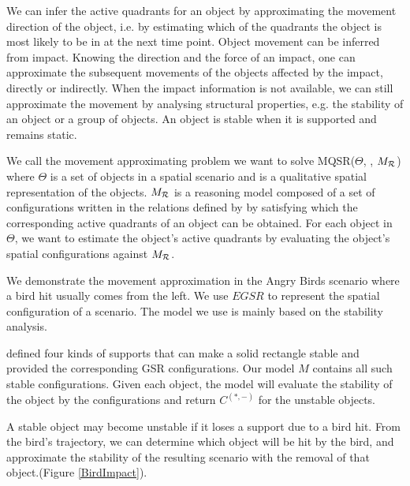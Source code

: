 \documentclass[letterpaper]{article}
\begin{document}
We can infer the active quadrants for an object by approximating the movement direction of the object, i.e. by estimating which of the quadrants the object is most likely to be in at the next time point. Object movement can be inferred from impact. Knowing the direction and the force of an impact, one can approximate the subsequent movements of the objects affected by the impact, directly or indirectly. When the impact information is not available, we can still approximate the movement by analysing structural properties, e.g. the stability of an object or a group of objects. An object is stable when it is supported and remains static. %

We call the movement approximating problem we want to solve MQSR($\Theta$, , $M_{\cal{R}}$) where $\Theta$ is a set of objects in a spatial scenario and  is a qualitative spatial representation of the objects. $M_{\cal{R}}$ is a reasoning model composed of a set of configurations written in the relations defined by  by satisfying which the corresponding active quadrants of an object can be obtained. For each object in $\Theta$, we want to estimate the object's active quadrants by evaluating the object's spatial configurations against $M_{\cal{R}}$.

We demonstrate the movement approximation in the Angry Birds scenario where a bird hit usually comes from the left. We use $EGSR$ to represent the spatial configuration of a scenario. The model we use is mainly based on the stability analysis.

\cite{Ge2013} defined four kinds of supports that can make a solid rectangle stable and provided the corresponding GSR configurations. Our model $M$ contains all such stable configurations. Given each object, the model will evaluate the stability of the object by the configurations and return $C^{(*,-)}$ for the unstable objects.

A stable object may become unstable if it loses a support due to a bird hit. From the bird's trajectory, we can determine which object will be hit by the bird, and approximate the stability of the resulting scenario with the removal of that object.(Figure \ref{BirdImpact}). 
\end{document}
